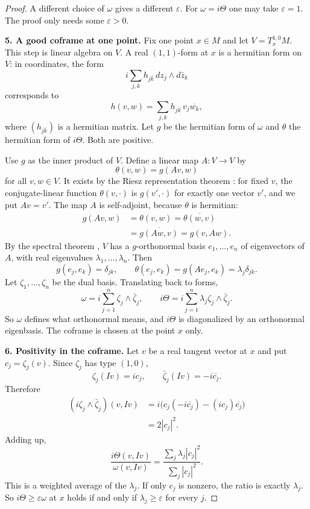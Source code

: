 \begin{proof}
A different choice of $\omega$ gives a
different $\varepsilon$. For
$\omega=i\Theta$ one may take
$\varepsilon=1$. The proof only needs
some $\varepsilon>0$.

\medskip\noindent
{\bf 5. A good coframe at one point.}
Fix one point $x\in M$ and let
$V=T^{1,0}_xM$. This step is linear
algebra on $V$.
A real $(1,1)$-form at $x$ is a
hermitian form on $V$: in coordinates,
the form
$$
i\sum_{j,k}h_{j\bar k}\,
dz_j\wedge d\bar z_k
$$
corresponds to
$$
h(v,w)=\sum_{j,k}h_{j\bar k}\,
v_j\overline{w_k},
$$
where $(h_{j\bar k})$ is a hermitian
matrix. Let $g$ be the hermitian form
of $\omega$ and $\theta$ the hermitian
form of $i\Theta$. Both are positive.

Use $g$ as the inner product of $V$.
Define a linear map $A:V\to V$ by
$$
\theta(v,w)=g(Av,w)
$$
for all $v,w\in V$. It exists by the
Riesz representation theorem
\cite[Theorem 1.9]{bachman-narici}: for
fixed $v$, the conjugate-linear function
$\theta(v,\cdot)$ is $g(v',\cdot)$ for
exactly one vector $v'$, and we put
$Av=v'$. The map $A$ is self-adjoint,
because $\theta$ is hermitian:
$$
\begin{aligned}
g(Av,w)&=\theta(v,w)
=\overline{\theta(w,v)}\\
&=\overline{g(Aw,v)}=g(v,Aw).
\end{aligned}
$$
By the spectral theorem
\cite[Theorems 1.10 and
2.1]{bachman-narici}, $V$ has a
$g$-orthonormal basis $e_1,\ldots,e_n$
of eigenvectors of $A$, with real
eigenvalues $\lambda_1,\ldots,\lambda_n$.
Then
$$
g(e_j,e_k)=\delta_{jk},
\qquad
\theta(e_j,e_k)=g(Ae_j,e_k)
=\lambda_j\delta_{jk}.
$$
Let $\zeta_1,\ldots,\zeta_n$ be the dual
basis. Translating back to forms,
$$
\omega=i\sum_{j=1}^n
\zeta_j\wedge\bar\zeta_j,
\qquad
i\Theta=i\sum_{j=1}^n
\lambda_j\zeta_j\wedge\bar\zeta_j.
$$
So $\omega$ defines what orthonormal
means, and $i\Theta$ is diagonalized by
an orthonormal eigenbasis. The coframe
is chosen at the point $x$ only.

\medskip\noindent
{\bf 6. Positivity in the coframe.}
Let $v$ be a real tangent vector at $x$
and put $c_j=\zeta_j(v)$. Since
$\zeta_j$ has type $(1,0)$,
$$
\zeta_j(Iv)=ic_j,
\qquad
\bar\zeta_j(Iv)=-i\overline{c_j}.
$$
Therefore
$$
\begin{aligned}
(i\zeta_j\wedge\bar\zeta_j)(v,Iv)
&=i\bigl(c_j(-i\overline{c_j})
-(ic_j)\overline{c_j}\bigr)\\
&=2|c_j|^2.
\end{aligned}
$$
Adding up,
$$
\frac{i\Theta(v,Iv)}{\omega(v,Iv)}
=\frac{\sum_j\lambda_j|c_j|^2}
{\sum_j|c_j|^2}.
$$
This is a weighted average of the
$\lambda_j$. If only $c_j$ is nonzero,
the ratio is exactly $\lambda_j$.
So $i\Theta\geq\varepsilon\omega$ at $x$
holds if and only if
$\lambda_j\geq\varepsilon$ for every $j$.


\end{proof}
